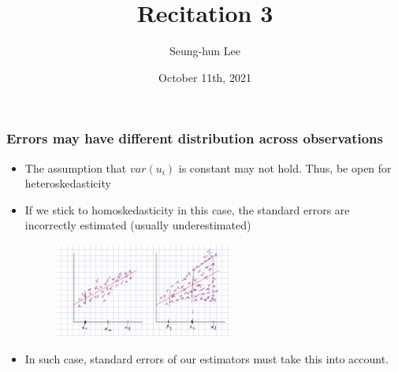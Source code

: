 \documentclass[aspectratio=169]{beamer}
\title[Recitation 3]{Recitation 3} %
\author[Seung-hun Lee]{Seung-hun Lee}
\institute[Columbia University]{Columbia University}
\date[October 11th, 2021]{October 11th, 2021}
\begin{document}
\begin{frame}
\titlepage
\end{frame}



\begin{frame}
\frametitle{Errors may have different distribution across observations}
\begin{itemize}
\item The assumption that $var(u_i)$ is constant may not hold. Thus, be open for heteroskedasticity
\item If we stick to homoskedasticity in this case, the standard errors are incorrectly estimated (usually underestimated)
\begin{figure}[H]
\centering
\includegraphics[width=0.55\textwidth]{hetero.png}
\end{figure}
\item  In such case, standard errors of our estimators must take this into account.
\end{itemize}
\end{frame}
\end{document}
